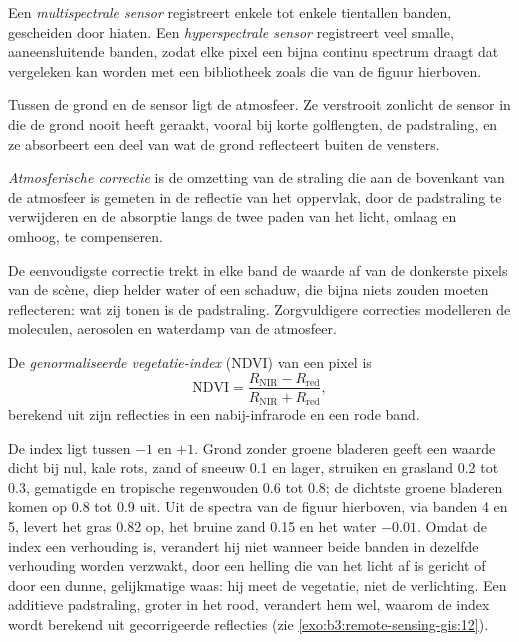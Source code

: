 \begin{definition}\label{def:b3:remote-sensing-gis:sensors}
Een \emph{multispectrale sensor} registreert enkele
tot enkele tientallen banden, gescheiden door hiaten. Een \emph{hyperspectrale
sensor} registreert veel smalle, aaneensluitende banden,
zodat elke pixel een bijna continu spectrum draagt dat vergeleken kan worden
met een bibliotheek zoals die van de figuur hierboven.
\end{definition}

Tussen de grond en de sensor ligt de atmosfeer. Ze verstrooit zonlicht de sensor in
die de grond nooit heeft geraakt, vooral bij
korte golflengten, de padstraling, en ze absorbeert een deel van wat de
grond reflecteert buiten de vensters.

\begin{definition}\label{def:b3:remote-sensing-gis:atm-correction}
\emph{Atmosferische correctie} is de
omzetting van de straling die aan de bovenkant van de atmosfeer is gemeten in
de reflectie van het oppervlak, door de padstraling te verwijderen en
de absorptie langs de twee paden van het licht, omlaag en omhoog, te compenseren.
\end{definition}

De eenvoudigste correctie trekt in elke band de waarde af van de donkerste
pixels van de scène, diep helder water of een schaduw, die bijna niets zouden moeten
reflecteren: wat zij tonen is de padstraling. Zorgvuldigere correcties
modelleren de moleculen, aerosolen en waterdamp van de atmosfeer.

\begin{definition}\label{def:b3:remote-sensing-gis:ndvi}
De \emph{genormaliseerde vegetatie-index}
(NDVI) van een pixel is
\[
\mathrm{NDVI} = \frac{R_\mathrm{NIR} - R_\mathrm{red}}{R_\mathrm{NIR} + R_\mathrm{red}} ,
\]
berekend uit zijn reflecties in een nabij-infrarode en een rode band.
\end{definition}

De index ligt tussen $-1$ en $+1$. Grond zonder groene bladeren geeft een
waarde dicht bij nul, kale rots, zand of sneeuw \num{0.1} en lager,
struiken en grasland 0.2 tot 0.3, gematigde en tropische regenwouden 0.6 tot
0.8; de dichtste groene bladeren komen op 0.8 tot 0.9 uit. Uit de spectra van de
figuur hierboven, via banden 4 en 5, levert het gras 0.82 op, het bruine zand
0.15 en het water $-0.01$. Omdat de index een verhouding is, verandert hij niet wanneer
beide banden in dezelfde verhouding worden verzwakt, door een helling die van het licht af
is gericht of door een dunne, gelijkmatige waas: hij meet de vegetatie, niet de
verlichting. Een additieve padstraling, groter in het rood, verandert hem wel,
waarom de index wordt berekend uit gecorrigeerde reflecties
(zie \cref{exo:b3:remote-sensing-gis:12}).

